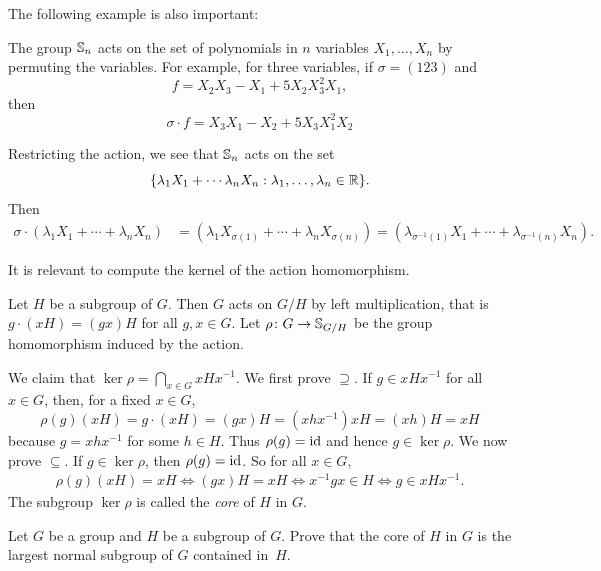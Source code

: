The following example is also important: 

\begin{optional}
\begin{example}
    The group $\mathbb{S}_n$ acts on the set of polynomials in
    $n$ variables $X_1,\dots,X_n$
    by permuting the variables. For example, for three variables, if 
    $\sigma=(123)$ and 
    \[
    f=X_2X_3-X_1+5X_2X_3^2X_1,
    \]
    then 
    \[
    \sigma\cdot 
    f=X_3X_1-X_2+5X_3X_1^2X_2
    \]

    Restricting the action, we see that 
    $\mathbb{S}_n$ acts on the set 
    \[
    \{\lambda_1X_1+\cdots\lambda_nX_n:\lambda_1,\dots,\lambda_n\in\mathbb{R}\}.
    \]
    Then 
    \begin{align*}
    \sigma \cdot (\lambda_1X_1+\cdots+\lambda_nX_n) &= (\lambda_1X_{\sigma(1)}+\cdots+\lambda_nX_{\sigma(n)})
    =(\lambda_{\sigma^{-1}(1)}X_1+\cdots+\lambda_{\sigma^{-1}(n)}X_n).
    \end{align*}
\end{example}
\end{optional}

It is relevant to compute the kernel of the action homomorphism. 

\begin{example}
Let $H$ be a subgroup of $G$. Then $G$ 
acts on $G/H$ by left multiplication, that is 
$g\cdot (xH)=(gx)H$ for all $g,x\in G$. Let $\rho\colon G\to\mathbb{S}_{G/H}$ be the group homomorphism induced by the action. 

We claim that $\ker\rho=\bigcap_{x\in G}xHx^{-1}$. 
We first prove $\supseteq$. If $g\in xHx^{-1}$ for all 
$x\in G$, then, for a fixed $x\in G$,
 \[
 \rho(g)(xH)=g\cdot (xH)=(gx)H=(xhx^{-1})xH=(xh)H=xH
 \]
because $g=xhx^{-1}$ for some $h\in H$. Thus $\rho(g)=\operatorname{id}$ 
and hence $g\in\ker\rho$. We now prove 
$\subseteq$. If $g\in\ker\rho$, then
 $\rho(g)=\operatorname{id}$. So for all $x\in G$,
 \begin{align*}
\rho(g)(xH)=xH
\Longleftrightarrow (gx)H=xH
\Longleftrightarrow x^{-1}gx\in H
\Longleftrightarrow g\in xHx^{-1}.
 \end{align*}
The subgroup $\ker\rho$ is called the \emph{core} of $H$ in $G$. 
\end{example}

\begin{exercise}
    Let $G$ be a group and $H$ be a subgroup of $G$. Prove that
    the core 
    of $H$ in $G$ is the largest normal subgroup of $G$ 
    contained in~$H$.
\end{exercise}

